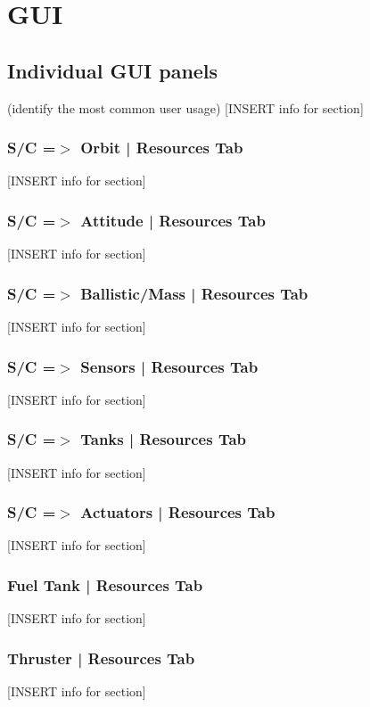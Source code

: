 \chapter{GUI}
\label{Ch:GUI}

    \section{Individual GUI panels}
    (identify the most common user usage)
    [INSERT info for section]

        \subsection{S/C =$>$ Orbit | Resources Tab}
        [INSERT info for section]

        \subsection{S/C =$>$ Attitude | Resources Tab}
        [INSERT info for section]

        \subsection{S/C =$>$ Ballistic/Mass | Resources Tab}
        [INSERT info for section]

        \subsection{S/C =$>$ Sensors | Resources Tab}
        [INSERT info for section]

        \subsection{S/C =$>$ Tanks | Resources Tab}
        [INSERT info for section]

        \subsection{S/C =$>$ Actuators | Resources Tab}
        [INSERT info for section]

        \subsection{Fuel Tank | Resources Tab}
        [INSERT info for section]

        \subsection{Thruster | Resources Tab}
        [INSERT info for section]

